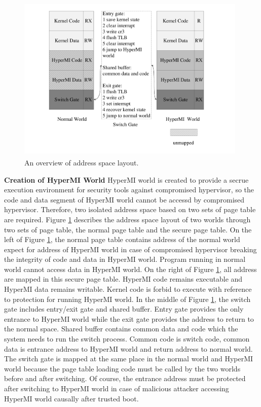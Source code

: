 \documentclass[conference]{IEEEtran}
\begin{document}
\begin{figure}
\centerline{\includegraphics[width=11cm, height=8cm]{pdfvmcs2.pdf}}%
\caption{An overview of address space layout.} \label{fig2}
\end{figure}

\textbf{Creation of HyperMI World}
HyperMI world is created to provide a secrue execution environment for security tools against compromised hypervisor, so the code and data segment of HyperMI world cannot be accessd by compromised hypervisor. Therefore, two isolated address space based on two sets of page table are required.
Figure \ref{fig2} describes the address space layout of two worlds through two sets of page table, the normal page table and the secure page table. On the left of Figure \ref{fig2}, the normal page table contains address of the normal world expect for address of HyperMI world in case of compromised hypervisor breaking the integrity of code and data in HyperMI world. Program running in normal world cannot access data in HyperMI world. On the right of Figure \ref{fig2}, all address are mapped in this secure page table.
HyperMI code remains executable and HyperMI data remains writable. Kernel code is forbid to execute with reference to protection for running HyperMI world. 
In the middle of Figure \ref{fig2}, the switch gate includes entry/exit gate and shared buffer. Entry gate provides the only entrance to HyperMI world while the exit gate provides the address to return to the normal space. Shared buffer contains common data and code which the system needs to run the switch process. Common code is switch code, common data is entrance address to HyperMI world and return address to normal world. The switch gate is mapped at the same place in the normal world and HyperMI world because the page table loading code must be called by the two worlds before and after switching. Of course, the entrance address must be protected after switching to HyperMI world in case of malicious attacker accessing HyperMI world causally after trusted boot. 
\end{document}
